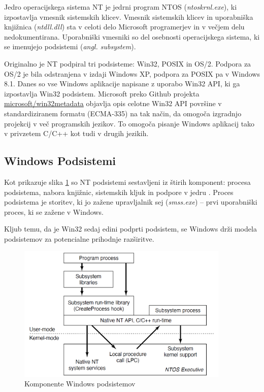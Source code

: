 \documentclass[a4paper,12pt,openright]{book}
\begin{document}
Jedro operacijskega sistema NT je jedrni program NTOS (\textit{ntoskrnl.exe}), ki izpostavlja vmesnik sistemskih klicev.
Vmesnik sistemskih klicev in uporabniška knjižnica (\textit{ntdll.dll}) sta v celoti delo Microsoft programerjev in v večjem delu nedokumentirana.
Uporabniški vmesniki so del osebnosti operacijskega sistema, ki se imenujejo podsistemi (\textit{angl. subsystem}).

Originalno je NT podpiral tri podsisteme: Win32, POSIX in OS/2.
Podpora za OS/2 je bila odstranjena v izdaji Windows XP, podpora za POSIX pa v Windows 8.1.
Danes so vse Windows aplikacije napisane z uporabo Win32 API, ki ga izpostavlja Win32 podsistem.
Microsoft preko Github projekta \href{https://github.com/microsoft/win32metadata}{microsoft/win32metadata} objavlja opis celotne Win32 API površine v standardiziranem formatu (ECMA-335) na tak način, da omogoča izgradnjo projekcij v več programskih jezikov.
To omogoča pisanje Windows aplikacij tako v privzetem C/C++ kot tudi v drugih jezikih.

\subsection{Windows Podsistemi}

Kot prikazuje slika \ref{fig:windows_subsystems_components} so NT podsistemi sestavljeni iz štirih komponent: procesa podsistema, nabora knjižnic, sistemskih kljuk in podpore v jedru \cite{Tanenbaum_Bos_2023}.
Proces podsistema je storitev, ki jo zažene upravljalnik sej (\textit{smss.exe}) -- prvi uporabniški proces, ki se zažene v Windows.

Kljub temu, da je Win32 sedaj edini podprti podsistem, se Windows drži modela podsistemov za potencialne prihodnje razširitve.

\begin{figure}[h!]
	\begin{center}
		\includegraphics[width=0.9\textwidth]{images/windows_subsystems_components.png}
	\end{center}
	\caption{Komponente Windows podsistemov \cite{Tanenbaum_Bos_2023}}
	\label{fig:windows_subsystems_components}
\end{figure}
\end{document}
